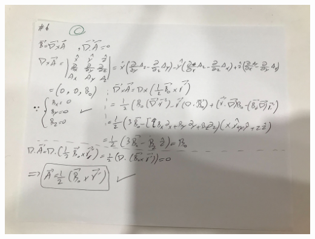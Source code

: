 \documentclass[fleqn]{article}
\begin{document}
\begin{enumerate}
      \pagebreak

      \includegraphics[height=16cm, width=17cm]{4.jpg}


  \end{enumerate}
\end{document}
